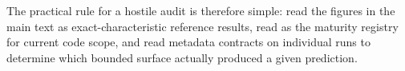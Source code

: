 The practical rule for a hostile audit is therefore simple: read the figures in the main text as exact-characteristic reference results, read  as the maturity registry for current code scope, and read metadata contracts on individual runs to determine which bounded surface actually produced a given prediction.
